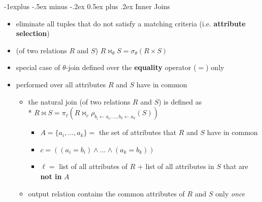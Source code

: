 \documentclass[10pt, landscape]{article}
\makeatletter
\renewcommand{\subsection}{\@startsection{subsection}{2}{0mm}%
  {-1explus -.5ex minus -.2ex}%
  {0.5ex plus .2ex}%
{\normalfont\normalsize\bfseries}}
\makeatother
\begin{document}
\begin{multicols*}{4}
  \subsection{Inner Joins} 
  \begin{itemize}
    \item eliminate all tuples that do not satisfy a matching criteria (i.e. \textbf{attribute selection})
    \item {} (of two relations $R$ and $S$) \( {\displaystyle{R \bowtie_\theta S = \sigma_\theta(R \times S)}} \) 
    \item {} special case of $\theta$-join defined over the  \textbf{equality} operator ($=$) only
    \item {} performed over all attributes $R$ and $S$ have in common
      \begin{itemize}
        \item the natural join (of two relations $R$ and $S$) is defined as 
          \\* $R \Join S = \pi_\ell(R\Join_c \rho_{b_i \leftarrow a_i, \dots, b_k \leftarrow a_k}(S))$
          \begin{itemize}
            \item $A=\{a_i, \dots, a_k\} =$ the set of attributes that $R$ and $S$ have in common
            \item $c = ((a_i = b_i) \land \dots \land (a_k = b_k))$
            \item $\ell =$ list of all attributes of $R$ + list of all attributes in $S$ that are \textbf{not in}  $A$
          \end{itemize}
        \item output relation contains the common attributes of $R$ and $S$ only \textit{once} 
      \end{itemize}
  \end{itemize}


\end{multicols*}
\end{document}
